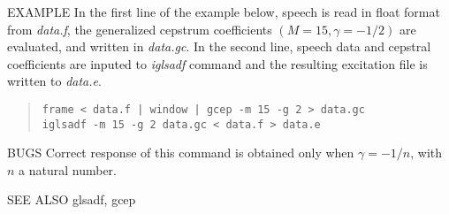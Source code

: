\begin{options}
\end{options}

\begin{qsection}{EXAMPLE}
In the first line of the example below, 
speech is read in float format from {\em data.f},
the generalized cepstrum coefficients $(M=15,\gamma = -1/2)$
are evaluated, and written in {\em data.gc}.
In the second line,
speech data and cepstral coefficients are
inputed to {\em iglsadf} command and the resulting excitation file
is written to {\em data.e}.
\begin{quote}
 \verb!frame < data.f | window | gcep -m 15 -g 2 > data.gc!\\
 \verb!iglsadf -m 15 -g 2 data.gc < data.f > data.e!
\end{quote}
\end{qsection}

\begin{qsection}{BUGS}
Correct response of this command is obtained only when
$\gamma = -1/n$, with $n$ a natural number.
\end{qsection}
\begin{qsection}{SEE ALSO}
glsadf, gcep
\end{qsection}

